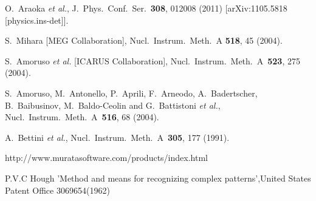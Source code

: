 \documentclass[final,3p,times,twocolumn]{elsarticle}
\begin{document}









\begin{thebibliography}{00}


  O.~Araoka {\it et al.},
  J.\ Phys.\ Conf.\ Ser.\  {\bf 308}, 012008 (2011)
  [arXiv:1105.5818 [physics.ins-det]].

S.~Mihara [MEG Collaboration],
Nucl.\ Instrum.\ Meth.\ A {\bf 518}, 45 (2004).

  S.~Amoruso {\it et al.} [ICARUS Collaboration],
  Nucl.\ Instrum.\ Meth.\ A\ {\bf 523}, 275  (2004).

  S.~Amoruso, M.~Antonello, P.~Aprili, F.~Arneodo, A.~Badertscher, B.~Baibusinov, M.~Baldo-Ceolin and G.~Battistoni {\it et al.},
  Nucl.\ Instrum.\ Meth.\ A\ {\bf 516}, 68  (2004).

  A.~Bettini {\it et al.}, Nucl.\ Instrum.\ Meth.\ A\ {\bf 305}, 177 (1991).

http://www.muratasoftware.com/products/index.html

  P.V.C Hough 'Method and means for recognizing complex patterns',United States Patent Office 3069654(1962) 

\end{thebibliography}
\end{document}
